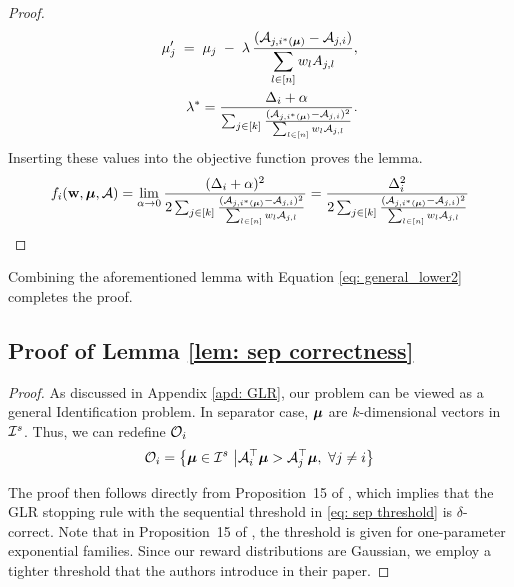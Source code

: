 \begin{proof}
            \begin{align*}
                \mu'_j \;=\; \mu_j \;-\; \lambda\,\frac{(\mathcal{A}_{j,i^*(\boldsymbol{\mu})} -  \mathcal{A}_{j,i})}{\displaystyle\sum_{l \in [n]} w_l A_{j,l}}, \\
                \lambda^* = \frac{\Delta_i + \alpha}{\sum_{j \in [k]} \frac{(\mathcal{A}_{j, i^*(\boldsymbol{\mu})} - \mathcal{A}_{j, i})^2}{\sum_{l \in [n]}w_{l}\mathcal{A}_{j,l}}}.
            \end{align*}
            Inserting these values into the objective function proves the lemma.
            \begin{align*}
                f_i(\mathbf{w}, \boldsymbol{\mu}, \mathcal{A}) = \lim_{\alpha \rightarrow 0} \frac{(\Delta_{i} + \alpha)^2}{2 \sum_{j \in [k]} \frac{(\mathcal{A}_{j, i^*(\boldsymbol{\mu})} - \mathcal{A}_{j, i})^2}{\sum_{l \in [n]}w_{l}\mathcal{A}_{j,l}}} = \frac{\Delta_{i}^2}{2 \sum_{j \in [k]} \frac{(\mathcal{A}_{j, i^*(\boldsymbol{\mu})} - \mathcal{A}_{j, i})^2}{\sum_{l \in [n]}w_{l}\mathcal{A}_{j,l}}}
            \end{align*}
\end{proof}
Combining the aforementioned lemma with Equation \eqref{eq: general_lower2} completes the proof.

\subsection{Proof of Lemma \ref{lem: sep correctness}}

\sepCorrectness*

\begin{proof}
    As discussed in Appendix \ref{apd: GLR}, our problem can be viewed as a general Identification problem. In separator case, $\boldsymbol{\mu}$ are $k$-dimensional vectors in $\mathcal{I}^s$. Thus, we can redefine $\mathcal{O}_i$
    $$
        \mathcal{O}_i = \left\{ \boldsymbol{\mu} \in \mathcal{I}^s \ \big| \mathcal{A}_i^\top \boldsymbol{\mu} > \mathcal{A}_j^\top \boldsymbol{\mu}, \ \forall j \neq i \right\}
    $$
        
    The proof then follows directly from Proposition~15 of \cite{kaufmann2021mixture}, which implies that the GLR stopping rule with the sequential threshold in \eqref{eq: sep threshold} is \(\delta\)-correct. Note that in Proposition~15 of \cite{kaufmann2021mixture}, the threshold is given for one-parameter exponential families. Since our reward distributions are Gaussian, we employ a tighter threshold that the authors introduce in their paper.
\end{proof}



